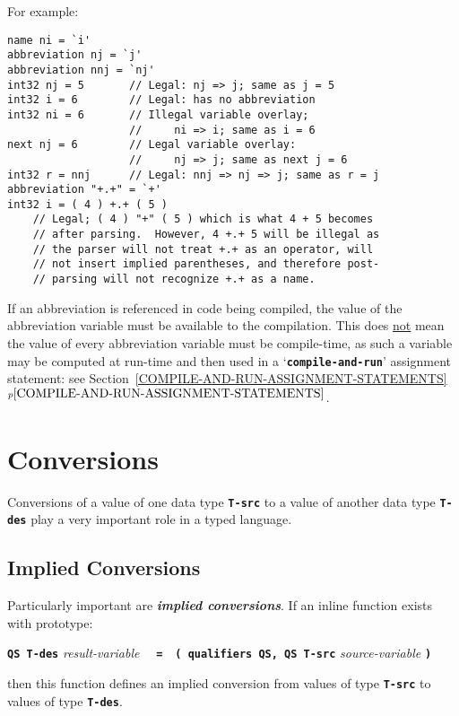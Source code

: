 \documentclass[12pt]{article}
\newcommand{\TT}[1]{{\tt \bfseries #1}}
\newcommand{\skey}[2]{{\bf \em #1#2}\index{#1}}
\newcommand{\itemref}[1]{\ref{#1}$^{p\pageref{#1}}$}
\newenvironment{indpar}[1][0.3in]%
	{\begin{list}{}%
		     {\setlength{\itemsep}{0in}%
		      \setlength{\topsep}{0in}%
		      \setlength{\parsep}{1ex}%
		      \setlength{\labelwidth}{#1}%
		      \setlength{\leftmargin}{#1}%
		      \addtolength{\leftmargin}{\labelsep}}%
	 \item}%
	{\end{list}}
\begin{document}
For example:
\begin{indpar}[0.1in]\begin{verbatim}
name ni = `i'
abbreviation nj = `j'
abbreviation nnj = `nj'
int32 nj = 5       // Legal: nj => j; same as j = 5
int32 i = 6        // Legal: has no abbreviation
int32 ni = 6       // Illegal variable overlay;
                   //     ni => i; same as i = 6
next nj = 6        // Legal variable overlay:
                   //     nj => j; same as next j = 6
int32 r = nnj      // Legal: nnj => nj => j; same as r = j 
abbreviation "+.+" = `+'
int32 i = ( 4 ) +.+ ( 5 )
    // Legal; ( 4 ) "+" ( 5 ) which is what 4 + 5 becomes
    // after parsing.  However, 4 +.+ 5 will be illegal as
    // the parser will not treat +.+ as an operator, will
    // not insert implied parentheses, and therefore post-
    // parsing will not recognize +.+ as a name.
\end{verbatim}\end{indpar}

If an abbreviation is referenced in code being compiled, the value
of the abbreviation variable must be available to the compilation.
This does \underline{not} mean the value of every abbreviation
variable must be compile-time, as such a variable may be computed
at run-time and then used in a `\TT{compile-and-run}' assignment
statement: see Section~\itemref{COMPILE-AND-RUN-ASSIGNMENT-STATEMENTS}.

\section{Conversions}
\label{CONVERSIONS}

Conversions of a value of one data type \TT{T-src} to a value of another
data type \TT{T-des} play a very important role in a typed language.

\subsection{Implied Conversions}
\label{IMPLIED-CONVERSIONS}

Particularly important are \skey{implied conversion}s.  If an inline function
exists with prototype:
\begin{center}
\TT{QS T-des} {\em result-variable}%
    ~~\TT{=}~~\TT{( qualifiers QS, QS T-src} {\em source-variable} \TT{)}
\end{center}
then this function defines an implied conversion from values of
type \TT{T-src} to values of type \TT{T-des}.
\end{document}
